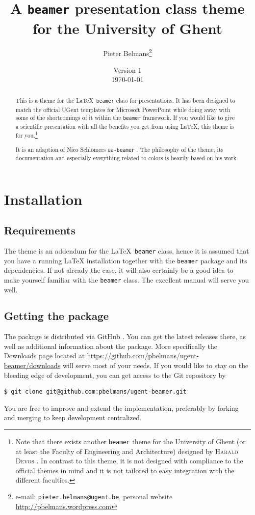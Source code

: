 \documentclass[a4paper,10pt]{article}
\title{A \texttt{beamer} presentation class theme for the University of Ghent}
\author{Pieter Belmans\thanks{e-mail: \href{mailto:pieter.belmans@ugent.be}{\nolinkurl{pieter.belmans@ugent.be}}, personal website \url{http://pbelmans.wordpress.com}}}
\date{Version 1 \\ \today}
\theoremstyle{definition}
\begin{document}
\maketitle

\begin{abstract}
  This is a theme for the \LaTeX\ \texttt{beamer} class for presentations. It has been designed to match the official UGent templates for Microsoft PowerPoint\textsuperscript{\textregistered} while doing away with some of the shortcomings of it within the \texttt{beamer} framework. If you would like to give a scientific presentation with all the benefits you get from using \LaTeX, this theme is for you.\footnote{Note that there exists another \texttt{beamer} theme for the University of Ghent (or at least the Faculty of Engineering and Architecture) designed by \textsc{Harald Devos} \cite{devos-theme}. In contrast to this theme, it is not designed with compliance to the official themes in mind and it is not tailored to easy integration with the different faculties.}

  It is an adaption of Nico Schl\"omers \texttt{ua-beamer} \cite{ua-beamer}. The philosophy of the theme, its documentation and especially everything related to colors is heavily based on his work.
\end{abstract}


\section{Installation}

\subsection{Requirements}
  The theme is an addendum for the \LaTeX\ \texttt{beamer} class, hence it is assumed that you have a running \LaTeX{} installation together with the \texttt{beamer} package \cite{beamer-repository} and its dependencies. If not already the case, it will also certainly be a good idea to make yourself familiar with the \texttt{beamer} class. The excellent manual \cite{beamer-manual} will serve you well.

\subsection{Getting the package}

The package is distributed via GitHub \cite{ugent-beamer}. You can get the latest releases there, as well as additional information about the package. More specifically the Downloads page located at \url{https://github.com/pbelmans/ugent-beamer/downloads} will serve most of your needs. If you would like to stay on the bleeding edge of development, you can get access to the Git repository by
\begin{verbatim}
$ git clone git@github.com:pbelmans/ugent-beamer.git
\end{verbatim}
You are free to improve and extend the implementation, preferably by forking and merging to keep development centralized.
\end{document}
